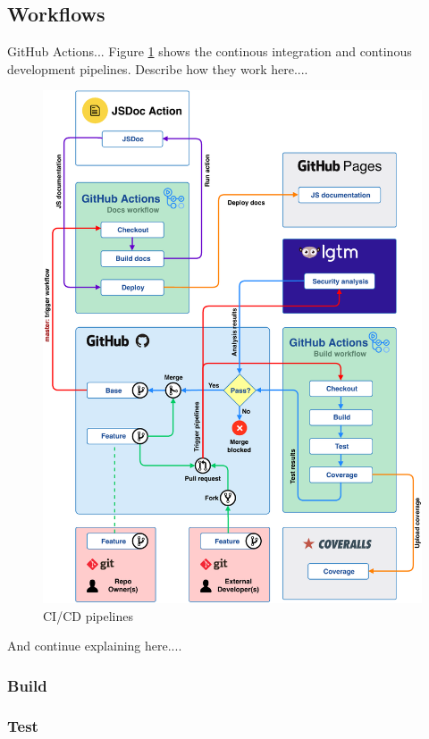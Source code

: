 \subsection{Workflows}
GitHub Actions...
Figure \ref{fig:cicd-pipelines} shows the continous integration and continous development pipelines. Describe how they work here....
\begin{figure}[h]
    \setlength{\abovecaptionskip}{25pt}
    \centering
    \includegraphics[page=1,scale=1]{sections/methodology/figures/pipelines.pdf}
    \caption{CI/CD pipelines}
    \label{fig:cicd-pipelines}
\end{figure}
\clearpage

And continue explaining here....
\subsubsection{Build}
\subsubsection{Test}
